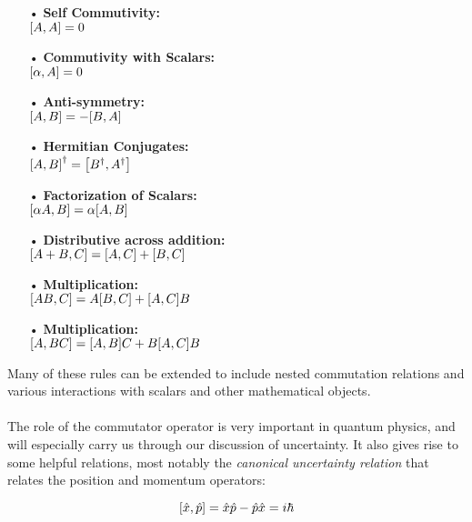 \documentclass[12pt,letterpaper]{book}
\begin{document}
\begin{multicols}{2}
\begin{itemize}
\item[•]\textbf{Self Commutivity:}\\
$ \comm{A}{A} = 0$
\item[•]\textbf{Commutivity with Scalars:}\\
$\comm{\alpha}{A} = 0$
\item[•]\textbf{Anti-symmetry:}\\
$ \comm{A}{B} = -\comm{B}{A} $
\item[•]\textbf{Hermitian Conjugates:}\\
$\comm{A}{B}^\dagger  = \comm{B^\dagger}{A^\dagger} $

\columnbreak

\item[•]\textbf{Factorization of Scalars:}\\
$\comm{\alpha A}{B} = \alpha \comm{A}{B}$
\item[•]\textbf{Distributive across addition:}\\
$\comm{A+B}{C} = \comm{A}{C} + \comm{B}{C}$
\item[•]\textbf{Multiplication:}\\
$\comm{AB}{C} = A\comm{B}{C} + \comm{A}{C}B$
\item[•]\textbf{Multiplication:}\\
$\comm{A}{BC} = \comm{A}{B}C + B\comm{A}{C}B$
\end{itemize}
\end{multicols}

Many of these rules can be extended to include nested commutation relations and various interactions with scalars and other mathematical objects.

\paragraph*{}The role of the commutator operator is very important in quantum physics, and will especially carry us through our discussion of uncertainty. It also gives rise to some helpful relations, most notably the \textit{canonical uncertainty relation} that relates the position and momentum operators:

\begin{equation}
\comm{\hat{x}}{\hat{p}} = \hat{x}\hat{p} - \hat{p}\hat{x} = i\hbar
\end{equation}


\end{document}
